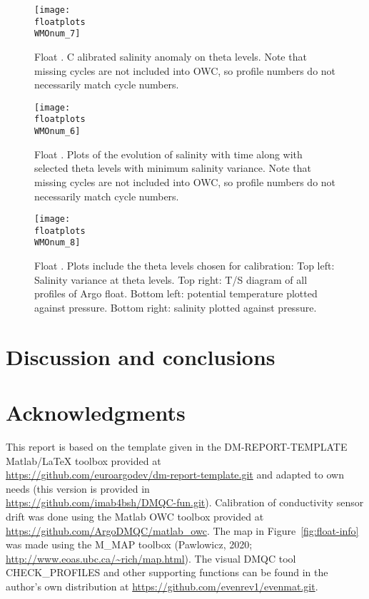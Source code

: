 \documentclass{article}
\begin{document}
\begin{figure}[p]
    \centering    
    \texttt{[image: \\floatplots\\WMOnum\_7]}
    \caption{Float \WMOnum.  C alibrated salinity anomaly on theta levels.
      Note that missing cycles are not included into OWC, so profile numbers do
      not necessarily match cycle numbers.}
    \label{CalibSalAnomOnTheta}
\end{figure}
\begin{figure}[p]
    \centering    
    \texttt{[image: \\floatplots\\WMOnum\_6]}
    \caption{Float \WMOnum. Plots of the evolution of salinity with time
      along with selected theta levels with minimum salinity variance.
      Note that missing cycles are not included into OWC, so profile numbers do
      not necessarily match cycle numbers.} 
    \label{SalErrOnTheta}
\end{figure}
\begin{figure}[p]
  \centerline{\texttt{[image: \\floatplots\\WMOnum\_8]}}
  \caption{Float \WMOnum. Plots include the theta levels chosen for
    calibration: Top left: Salinity variance at theta levels. Top right:
    T/S diagram of all profiles of Argo float. Bottom left: potential
    temperature plotted against pressure. Bottom right: salinity plotted
    against pressure.} 
  \label{Salinity_OWlevels}
\end{figure}




\FloatBarrier
\newpage
\section{Discussion and conclusions}\label{sec:discussion}






\section*{Acknowledgments}
This report is based on the template given in the DM-REPORT-TEMPLATE
Matlab/LaTeX toolbox provided at\\
\href{url}{https://github.com/euroargodev/dm-report-template.git} and
adapted to own needs (this version is provided in\\
\href{url}{https://github.com/imab4bsh/DMQC-fun.git}).  
%
Calibration of conductivity sensor drift was done using the Matlab OWC
toolbox provided at \href{url}{https://github.com/ArgoDMQC/matlab\_owc}.
%
The map in Figure~\ref{fig:float-info} was made using the M\_MAP toolbox
(Pawlowicz, 2020; \url{http://www.eoas.ubc.ca/~rich/map.html}).
%
The visual DMQC tool CHECK\_PROFILES and other supporting functions can be
found in the author's own distribution at
\href{url}{https://github.com/evenrev1/evenmat.git}.
\end{document}

